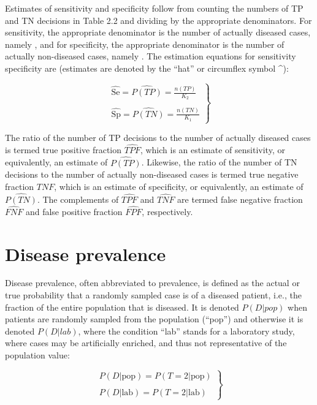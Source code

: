 \documentclass[
]{book}
\begin{document}
Estimates of sensitivity and specificity follow from counting the numbers of TP and TN decisions in Table 2.2 and dividing by the appropriate denominators. For sensitivity, the appropriate denominator is the number of actually diseased cases, namely , and for specificity, the appropriate denominator is the number of actually non-diseased cases, namely . The estimation equations for sensitivity specificity are (estimates are denoted by the ``hat'' or circumflex symbol \^{}):

\begin{equation} 
\left.\begin{matrix}
\widehat{\text{Se}}=\widehat{P(TP)}=\frac{n(TP)}{K_2}\\
\\ 
\widehat{\text{Sp}}=\widehat{P(TN)}=\frac{n(TN)}{K_1}
\end{matrix}\right\}
\label{eq:binary-taskSeSpEstimates}
\end{equation}

The ratio of the number of TP decisions to the number of actually diseased cases is termed true positive fraction \(\widehat{TPF}\), which is an estimate of sensitivity, or equivalently, an estimate of \(\widehat{P(TP)}\). Likewise, the ratio of the number of TN decisions to the number of actually non-diseased cases is termed true negative fraction \(\widehat{TNF}\), which is an estimate of specificity, or equivalently, an estimate of \(\widehat{P(TN)}\). The complements of \(\widehat{TPF}\) and \(\widehat{TNF}\) are termed false negative fraction \(\widehat{FNF}\) and false positive fraction \(\widehat{FPF}\), respectively.

\hypertarget{disease-prevalence}{%
\section{Disease prevalence}\label{disease-prevalence}}

Disease prevalence, often abbreviated to prevalence, is defined as the actual or true probability that a randomly sampled case is of a diseased patient, i.e., the fraction of the entire population that is diseased. It is denoted \(P(D|pop)\) when patients are randomly sampled from the population (``pop'') and otherwise it is denoted \(P(D|lab)\), where the condition ``lab'' stands for a laboratory study, where cases may be artificially enriched, and thus not representative of the population value:

\begin{equation} 
\left.\begin{matrix}
P(D|\text{pop})=P(T=2|\text{pop})\\
\\ 
P(D|\text{lab})=P(T=2|\text{lab})
\end{matrix}\right\}
\label{eq:binary-taskDisPrev}
\end{equation}
\end{document}

